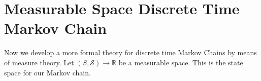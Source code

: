 \chapter{Measurable Space Discrete Time Markov Chain}

Now we develop a more formal theory for discrete time Markov Chains by means of measure theory.
Let $(S,\mathcal{S})\to\mathbb{R}$ be a measurable space. This is the state space for our Markov chain.

